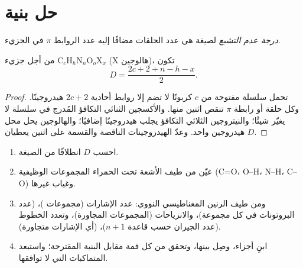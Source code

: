 \section{حل بنية}

\begin{definition}\label{def:b1:structure-spectroscopy:unsaturation}
\emph{درجة عدم التشبع} لصيغة
هي عدد الحلقات مضافًا إليه عدد الروابط $\pi$ في
الجزيء.
\end{definition}

\begin{proposition}\label{prop:b1:structure-spectroscopy:unsaturation-formula}
من أجل جزيء $\mathrm{C}_c\mathrm{H}_h\mathrm{N}_n\mathrm{O}_o\mathrm{X}_x$
(X هالوجين)، تكون 
\[
  D = \frac{2c + 2 + n - h - x}{2} .
\]
\end{proposition}

\begin{proof}
تحمل سلسلة مفتوحة من $c$ كربونًا لا تضم إلا روابط أحادية $2c + 2$
هيدروجينًا. وكل حلقة أو رابطة $\pi$ تنقص اثنين منها. والأكسجين الثنائي التكافؤ
المُدرج في سلسلة لا يغيّر شيئًا؛ والنيتروجين الثلاثي التكافؤ يجلب هيدروجينًا
إضافيًا؛ والهالوجين يحل محل هيدروجين واحد. وعدّ
الهيدروجينات الناقصة والقسمة على اثنين يعطيان $D$.
\end{proof}

\begin{method}[حل بنية]\label{met:b1:structure-spectroscopy:solve-structure}
\begin{enumerate}
  \item احسب $D$ انطلاقًا من الصيغة.
  \item عيّن من طيف الأشعة تحت الحمراء المجموعات الوظيفية (C=O، O--H، N--H،
        C--O) وغياب غيرها.
  \item ومن طيف الرنين المغناطيسي النووي: عدد الإشارات (مجموعات )،  (عدد البروتونات في كل مجموعة)، والانزياحات (المجموعات
        المجاورة)، وتعدد الخطوط (عدد الجيران حسب قاعدة $n + 1$)،
         (أي الإشارات متجاورة).
  \item ابنِ أجزاء، وصِل بينها، وتحقق من كل قمة مقابل
        البنية المقترحة؛ واستبعد المتماكبات التي لا توافقها.
\end{enumerate}
\end{method}

